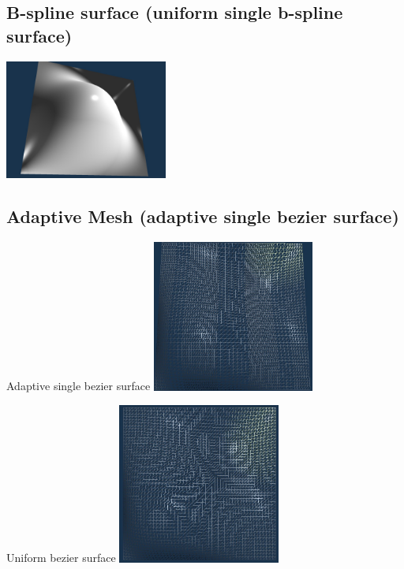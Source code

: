 \documentclass[acmtog]{acmart}
\begin{document}
\subsection{B-spline surface (uniform single b-spline surface)}

\begin{center}
	\includegraphics[width=0.4\textwidth]{./images/bspline.jpg}
\end{center}


\subsection{Adaptive Mesh (adaptive single bezier surface)}


\begin{center}
	Adaptive single bezier surface
	\includegraphics[width=0.4\textwidth]{images/adaptive-single-1.jpg}
\end{center}

\begin{center}
	Uniform bezier surface
	\includegraphics[width=0.4\textwidth]{images/not-adaptive-single-1.jpg}
\end{center}
\end{document}
